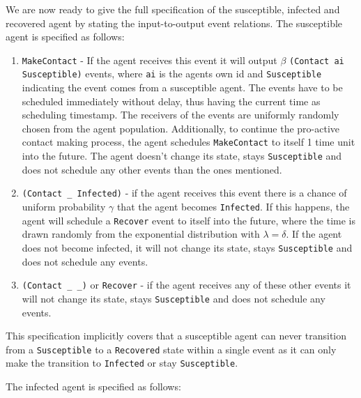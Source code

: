 
We are now ready to give the full specification of the susceptible, infected and recovered agent by stating the input-to-output event relations. The susceptible agent is specified as follows:

\begin{enumerate}
	\item \texttt{MakeContact} - If the agent receives this event it will output $\beta$ \texttt{(Contact ai Susceptible)} events, where \texttt{ai} is the agents own id and \texttt{Susceptible} indicating the event comes from a susceptible agent. The events have to be scheduled immediately without delay, thus having the current time as scheduling timestamp. The receivers of the events are uniformly randomly chosen from the agent population. Additionally, to continue the pro-active contact making process, the agent schedules \texttt{MakeContact} to itself 1 time unit into the future. The agent doesn't change its state, stays \texttt{Susceptible} and does not schedule any other events than the ones mentioned.
	
	\item \texttt{(Contact \_ Infected)} - if the agent receives this event there is a chance of uniform probability $\gamma$ that the agent becomes \texttt{Infected}. If this happens, the agent will schedule a \texttt{Recover} event to itself into the future, where the time is drawn randomly from the exponential distribution with $\lambda = \delta$. If the agent does not become infected, it will not change its state, stays \texttt{Susceptible} and does not schedule any events.
	
	\item \texttt{(Contact \_ \_)} or \texttt{Recover} - if the agent receives any of these other events it will not change its state, stays \texttt{Susceptible} and does not schedule any events.
\end{enumerate}

This specification implicitly covers that a susceptible agent can never transition from a \texttt{Susceptible} to a \texttt{Recovered} state within a single event as it can only make the transition to \texttt{Infected} or stay \texttt{Susceptible}. 

The infected agent is specified as follows:

